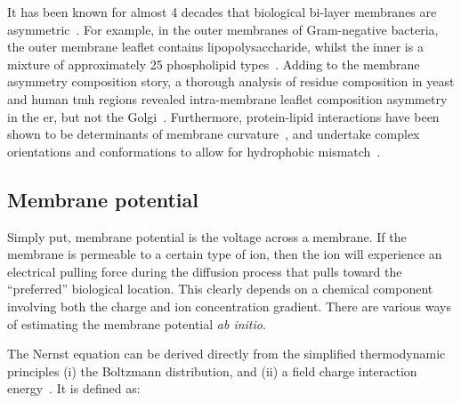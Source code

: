 
It has been known for almost 4 decades that biological bi\--layer membranes are asymmetric~\cite{Singer1972, OpdenKamp1979}.
For example, in the outer membranes of Gram-negative bacteria, the outer membrane leaflet contains lipopolysaccharide, whilst the inner is a mixture of approximately 25 phospholipid types~\cite{VanMeer2008}.
Adding to the membrane asymmetry composition story, a thorough analysis of residue composition in yeast and human \gls{tmh} regions revealed intra-membrane leaflet composition asymmetry in the \gls{er}, but not the Golgi~\cite{Sharpe2010}.
Furthermore, protein-lipid interactions have been shown to be determinants of membrane curvature~\cite{Jensen2004}, and undertake complex orientations and conformations to allow for hydrophobic mismatch~\cite{Planque2003}.


\subsection{Membrane potential}
Simply put, membrane potential is the voltage across a membrane.
If the membrane is permeable to a certain type of ion, then the ion will experience an electrical pulling force during the diffusion process that pulls toward the ``preferred'' biological location.
This clearly depends on a chemical component involving both the charge and ion concentration gradient.
There are various ways of estimating the membrane potential \textit{ab initio}.

The Nernst equation can be derived directly from the simplified thermodynamic principles (i) the Boltzmann distribution, and (ii) a field charge interaction energy~\cite{Feiner1994}.
It is defined as:

